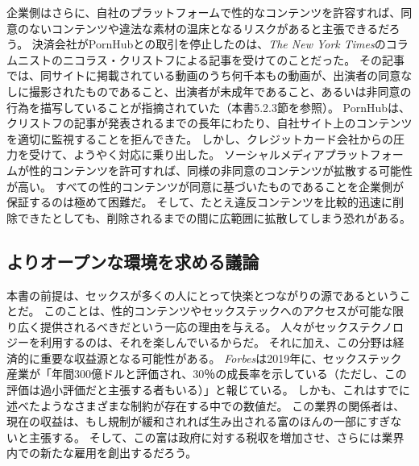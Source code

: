 \documentclass[paper=a4,book,openany]{jlreq}
\newcommand{\ig}[1]{}           %
\begin{document}
企業側はさらに、自社のプラットフォームで性的なコンテンツを許容すれば、同意のないコンテンツや違法な素材の温床となるリスクがあると主張できるだろう。
決済会社がPornHubとの取引を停止したのは、\emph{The New York Times}のコラムニストのニコラス・クリストフ\ig{Nicholas Kristof}による記事を受けてのことだった。
その記事では、同サイトに掲載されている動画のうち何千本もの動画が、出演者の同意なしに撮影されたものであること、出演者が未成年であること、あるいは非同意の行為を描写していることが指摘されていた（本書5.2.3節を参照）。
PornHubは、クリストフの記事が発表されるまでの長年にわたり、自社サイト上のコンテンツを適切に監視することを拒んできた。
しかし、クレジットカード会社からの圧力を受けて、ようやく対応に乗り出した。
ソーシャルメディアプラットフォームが性的コンテンツを許可すれば、同様の非同意のコンテンツが拡散する可能性が高い。
すべての性的コンテンツが同意に基づいたものであることを企業側が保証するのは極めて困難だ。
そして、たとえ違反コンテンツを比較的迅速に削除できたとしても、削除されるまでの間に広範囲に拡散してしまう恐れがある。

\subsection{よりオープンな環境を求める議論}

本書の前提は、セックスが多くの人にとって快楽とつながりの源であるということだ。
このことは、性的コンテンツやセックステックへのアクセスが可能な限り広く提供されるべきだという一応の理由を与える。
人々がセックステクノロジーを利用するのは、それを楽しんでいるからだ。
それに加え、この分野は経済的に重要な収益源となる可能性がある。
\emph{Forbes}は2019年に、セックステック産業が「年間300億ドルと評価され、30％の成長率を示している（ただし、この評価は過小評価だと主張する者もいる）」と報じている\citep{jaramillo19:_inves_sextec}。
しかも、これはすでに述べたようなさまざまな制約が存在する中での数値だ。
この業界の関係者は、現在の収益は、もし規制が緩和されれば生み出される富のほんの一部にすぎないと主張する。
そして、この富は政府に対する税収を増加させ、さらには業界内での新たな雇用を創出するだろう。
\end{document}

